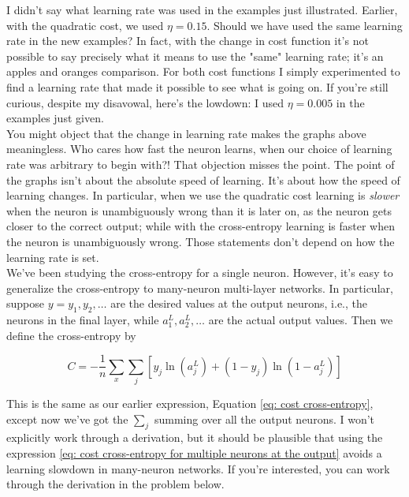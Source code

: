 \documentclass[a4paper,11pt,twoside]{report}
\begin{document}
I didn't say what learning rate was used in the examples just illustrated. Earlier, with the quadratic cost, we used $\eta=0.15$. Should we have used the same learning rate in the new examples? In fact, with the change in cost function it's not possible to say precisely what it means to use the "same" learning rate; it's an apples and oranges comparison. For both cost functions I simply experimented to find a learning rate that made it possible to see what is going on. If you're still curious, despite my disavowal, here's the lowdown: I used $\eta=0.005$ in the examples just given.\\

You might object that the change in learning rate makes the graphs above meaningless. Who cares how fast the neuron learns, when our choice of learning rate was arbitrary to begin with?! That objection misses the point. The point of the graphs isn't about the absolute speed of learning. It's about how the speed of learning changes. In particular, when we use the quadratic cost learning is \textit{slower} when the neuron is unambiguously wrong than it is later on, as the neuron gets closer to the correct output; while with the cross-entropy learning is faster when the neuron is unambiguously wrong. Those statements don't depend on how the learning rate is set.\\

We've been studying the cross-entropy for a single neuron. However, it's easy to generalize the cross-entropy to many-neuron multi-layer networks. In particular, suppose $y=y_1,y_2,\ldots$ are the desired values at the output neurons, i.e., the neurons in the final layer, while $a^L_1,a^L_2,\ldots$ are the actual output values. Then we define the cross-entropy by


\begin{equation}
C=-\frac{1}{n}\sum_x \sum_j\left[y_j \ln(a^L_j) +(1-y_j)\ln (1-a^L_j)\right]
\label{eq: cost cross-entropy for multiple neurons at the output}
\end{equation}

This is the same as our earlier expression, Equation \ref{eq: cost cross-entropy}, except now we've got the $\sum_j$ summing over all the output neurons. I won't explicitly work through a derivation, but it should be plausible that using the expression \ref{eq: cost cross-entropy for multiple neurons at the output} avoids a learning slowdown in many-neuron networks. If you're interested, you can work through the derivation in the problem below.
\end{document}
